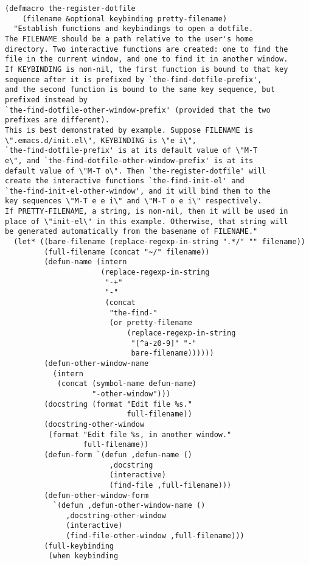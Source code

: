 \documentclass[11pt]{article}
\begin{document}
\begin{enumerate}
\begin{verbatim}
(defmacro the-register-dotfile
    (filename &optional keybinding pretty-filename)
  "Establish functions and keybindings to open a dotfile.
The FILENAME should be a path relative to the user's home
directory. Two interactive functions are created: one to find the
file in the current window, and one to find it in another window.
If KEYBINDING is non-nil, the first function is bound to that key
sequence after it is prefixed by `the-find-dotfile-prefix',
and the second function is bound to the same key sequence, but
prefixed instead by
`the-find-dotfile-other-window-prefix' (provided that the two
prefixes are different).
This is best demonstrated by example. Suppose FILENAME is
\".emacs.d/init.el\", KEYBINDING is \"e i\",
`the-find-dotfile-prefix' is at its default value of \"M-T
e\", and `the-find-dotfile-other-window-prefix' is at its
default value of \"M-T o\". Then `the-register-dotfile' will
create the interactive functions `the-find-init-el' and
`the-find-init-el-other-window', and it will bind them to the
key sequences \"M-T e e i\" and \"M-T o e i\" respectively.
If PRETTY-FILENAME, a string, is non-nil, then it will be used in
place of \"init-el\" in this example. Otherwise, that string will
be generated automatically from the basename of FILENAME."
  (let* ((bare-filename (replace-regexp-in-string ".*/" "" filename))
         (full-filename (concat "~/" filename))
         (defun-name (intern
                      (replace-regexp-in-string
                       "-+"
                       "-"
                       (concat
                        "the-find-"
                        (or pretty-filename
                            (replace-regexp-in-string
                             "[^a-z0-9]" "-"
                             bare-filename))))))
         (defun-other-window-name
           (intern
            (concat (symbol-name defun-name)
                    "-other-window")))
         (docstring (format "Edit file %s."
                            full-filename))
         (docstring-other-window
          (format "Edit file %s, in another window."
                  full-filename))
         (defun-form `(defun ,defun-name ()
                        ,docstring
                        (interactive)
                        (find-file ,full-filename)))
         (defun-other-window-form
           `(defun ,defun-other-window-name ()
              ,docstring-other-window
              (interactive)
              (find-file-other-window ,full-filename)))
         (full-keybinding
          (when keybinding

\end{verbatim}
\end{enumerate}
\end{document}
